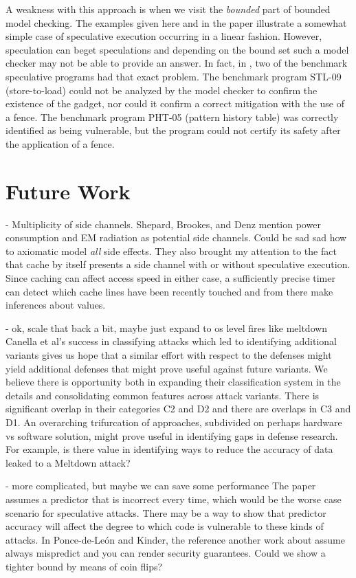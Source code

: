 \documentclass[11pt,conference]{IEEEtran}
\begin{document}
A weakness with this approach is when we visit the \emph{bounded} part of bounded model checking.
The examples given here and in the paper illustrate a somewhat simple case of speculative execution occurring in a linear fashion.
However, speculation can beget speculations and depending on the bound set such a model checker may not be able to provide an answer.
In fact, in \cite{cats2022}, two of the benchmark speculative programs had that exact problem.
The benchmark program STL-09 (store-to-load) could not be analyzed by the model checker to confirm the existence of the gadget, nor could it confirm a correct mitigation with the use of a fence.
The benchmark program PHT-05 (pattern history table) was correctly identified as being vulnerable, but the program could not certify its safety after the application of a fence.

\section{Future Work}\label{sec:future}

- Multiplicity of side channels.
Shepard, Brookes, and Denz \cite{shepherd2022transient} mention power consumption and EM radiation as potential side channels.
Could be sad sad how to axiomatic model \emph{all} side effects.
They also brought my attention to the fact that cache by itself presents a side channel with or without speculative execution.
Since caching can affect access speed in either case, a sufficiently precise timer can detect which cache lines have been recently touched and from there make inferences about values.

- ok, scale that back a bit, maybe just expand to os level fires like meltdown
Canella et al's success in classifying attacks which led to identifying additional variants gives us hope that a similar effort with respect to the defenses might yield additional defenses that might prove useful against future variants.
We believe there is opportunity both in expanding their classification system in the details and consolidating common features across attack variants.
There is significant overlap in their categories C2 and D2 and there are overlaps in C3 and D1.
An overarching trifurcation of approaches, subdivided on perhaps hardware vs software solution, might prove useful in identifying gaps in defense research.
For example, is there value in identifying ways to reduce the accuracy of data leaked to a Meltdown attack?

- more complicated, but maybe we can save some performance
The paper assumes a predictor that is incorrect every time, which would be the worse case scenario for speculative attacks.
There may be a way to show that predictor accuracy will affect the degree to which code is vulnerable to these kinds of attacks.
In Ponce-de-León and Kinder\cite{cats2022}, the reference another work about assume always mispredict and you can render security guarantees.
Could we show a tighter bound by means of coin flips?
\end{document}
